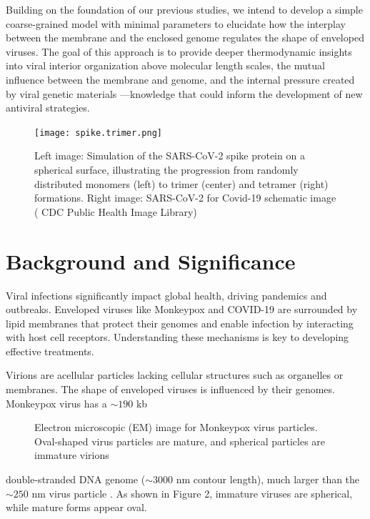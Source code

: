 \documentclass[12pt]{article}
\begin{document}
\begin{flushleft}
Building on the foundation of our previous studies, we intend to develop a simple coarse-grained model with minimal parameters to elucidate how the interplay between the membrane and the enclosed genome regulates the shape of enveloped viruses. The goal of this approach is to provide deeper thermodynamic insights into viral interior organization above molecular length scales, the mutual influence between the membrane and genome, and the internal pressure created by viral genetic materials —knowledge that could inform the development of new antiviral strategies.

\begin{figure}[!ht]
  \centering
  \texttt{[image: spike.trimer.png]}
  \caption{Left image: Simulation of the SARS-CoV-2 spike protein on a spherical surface, illustrating the progression from randomly distributed monomers (left) to trimer (center) and tetramer (right) formations. Right image: SARS-CoV-2 for Covid-19 schematic image ( CDC Public
Health Image Library) \cite{cdc-covid}}
\end{figure}

\vspace{-1em} 
\section*{Background and Significance}


Viral infections significantly impact global health, driving pandemics and outbreaks. Enveloped viruses like Monkeypox and COVID-19 are surrounded by lipid membranes that protect their genomes and enable infection by interacting with host cell receptors. Understanding these mechanisms is key to developing effective treatments.

Virions are acellular particles lacking cellular structures such as organelles or membranes.
The shape of enveloped viruses is influenced by their genomes. Monkeypox virus has a $\sim190$ kb 

\begin{figure}[!ht]
  \centering  
  \caption{Electron microscopic (EM) image for
Monkeypox virus particles. Oval-shaped
virus particles are mature, and spherical
particles are immature virions \cite{goldsmith2003monkeypox}}
\end{figure}




\noindent double-stranded DNA genome ($\sim3000$ nm contour length), much larger than the $\sim250$ nm virus particle \cite{erez2019diagnosis}\cite{parker2007human}. As shown in Figure 2, immature viruses are spherical, while mature forms appear oval.



\end{flushleft}
\end{document}
